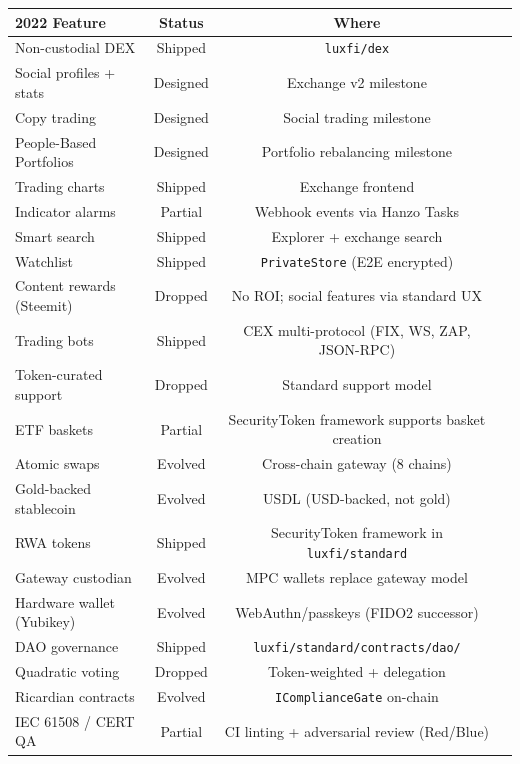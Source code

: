 \documentclass[11pt,a4paper]{article}
\begin{document}
\begin{center}
\small
\begin{tabular}{p{4.5cm}ccp{5cm}}
\toprule
\textbf{2022 Feature} & \textbf{Status} & \textbf{Where} \\
\midrule
Non-custodial DEX         & Shipped  & \texttt{luxfi/dex} \\
Social profiles + stats   & Designed & Exchange v2 milestone \\
Copy trading              & Designed & Social trading milestone \\
People-Based Portfolios   & Designed & Portfolio rebalancing milestone \\
Trading charts            & Shipped  & Exchange frontend \\
Indicator alarms          & Partial  & Webhook events via Hanzo Tasks \\
Smart search              & Shipped  & Explorer + exchange search \\
Watchlist                 & Shipped  & \texttt{PrivateStore} (E2E encrypted) \\
Content rewards (Steemit) & Dropped  & No ROI; social features via standard UX \\
Trading bots              & Shipped  & CEX multi-protocol (FIX, WS, ZAP, JSON-RPC) \\
Token-curated support     & Dropped  & Standard support model \\
ETF baskets               & Partial  & SecurityToken framework supports basket creation \\
Atomic swaps              & Evolved  & Cross-chain gateway (8 chains) \\
Gold-backed stablecoin    & Evolved  & USDL (USD-backed, not gold) \\
RWA tokens                & Shipped  & SecurityToken framework in \texttt{luxfi/standard} \\
Gateway custodian         & Evolved  & MPC wallets replace gateway model \\
Hardware wallet (Yubikey)  & Evolved  & WebAuthn/passkeys (FIDO2 successor) \\
DAO governance            & Shipped  & \texttt{luxfi/standard/contracts/dao/} \\
Quadratic voting          & Dropped  & Token-weighted + delegation \\
Ricardian contracts       & Evolved  & \texttt{IComplianceGate} on-chain \\
IEC 61508 / CERT QA       & Partial  & CI linting + adversarial review (Red/Blue) \\
\bottomrule
\end{tabular}
\end{center}
\end{document}
